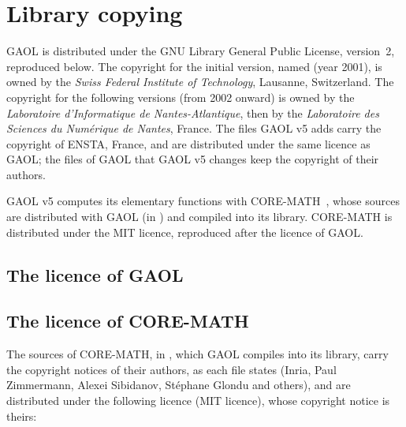 \chapter{Library copying}\label{chap:copying}

GAOL is distributed under the GNU Library General Public License,
version~2, reproduced below. The copyright for the initial version, named
 (year 2001), is owned by the \emph{Swiss Federal Institute of
Technology}, Lausanne, Switzerland. The copyright for the following versions
(from 2002 onward) is owned by the \emph{Laboratoire d'Informatique de
Nantes-Atlantique}, then by the \emph{Laboratoire des Sciences du
Num\'erique de Nantes}, France. The files GAOL v5 adds carry the copyright of
ENSTA, France, and are distributed under the same licence as GAOL; the files
of GAOL that GAOL v5 changes keep the copyright of their authors.
%

GAOL v5 computes its elementary functions with CORE-MATH~\cite{CoreMath:2022},
whose sources are distributed with GAOL (in ) and
compiled into its library. CORE-MATH is distributed under the MIT licence,
reproduced after the licence of GAOL.
%

\section{The licence of GAOL}


\section{The licence of CORE-MATH}

The sources of CORE-MATH, in , which GAOL compiles into
its library, carry the copyright notices of their authors, as each file states
(Inria, Paul Zimmermann, Alexei Sibidanov, St\'ephane Glondu and others), and
are distributed under the following licence (MIT licence), whose copyright
notice is theirs:

